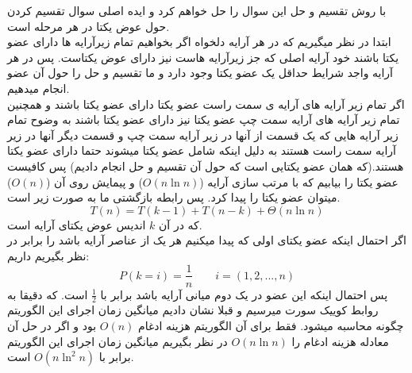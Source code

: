 \problem{}
با روش تقسیم و حل این سوال را حل خواهم کرد و ایده اصلی سوال تقسیم کردن حول
عوض یکتا در هر مرحله است.\\
ابتدا در نظر میگیریم که در هر آرایه دلخواه اگر بخواهیم تمام زیرآرایه ها دارای
عضو یکتا باشند خود آرایه اصلی که جز زیرآرایه هاست نیز دارای عوض یکتاست.
پس در هر آرایه واجد شرایط حداقل یک عضو یکتا وجود دارد و ما تقسیم و حل را
حول آن عضو انجام میدهیم.\\
اگر تمام زیر آرایه های آرایه ی سمت راست عضو یکتا دارای عضو یکتا باشند 
و همچنین تمام زیر آرایه های آرایه سمت چپ عضو یکتا نیز دارای عضو یکتا باشند
به وضوح تمام زیر آرایه هایی که یک قسمت از آنها در زیر آرایه سمت چپ
و قسمت دیگر آنها در زیر آرایه سمت راست هستند به دلیل اینکه شامل عضو یکتا میشوند
حتما دارای عضو یکتا هستند.(که همان عضو یکتایی است که حول آن تقسیم و حل انجام دادیم)
پس کافیست عضو یکتا را بیابیم که با مرتب سازی آرایه ($O(n\ln{n})$)
و پیمایش روی آن ($O(n)$)
میتوان عضو یکتا را پیدا کرد.
پس رابطه بازگشتی ما به صورت زیر است.\\
\[ T(n) = T(k-1) + T(n-k) + \Theta(n\ln{n}) \]
که در آن $k$ اندیس عوض یکتای آرایه است.\\
اگر احتمال اینکه عضو یکتای اولی که پیدا میکنیم هر یک از عناصر آرایه باشد را برابر در نظر بگیریم داریم:\\
\[P(k=i) = \frac{1}{n}  \quad \quad  i = (1,2,...,n)\]
پس احتمال اینکه این عضو در یک دوم میانی آرایه باشد برابر با $\frac{1}{2}$ است.
که دقیقا به روابط کوییک سورت میرسیم و قبلا نشان دادیم میانگین زمان اجرای این الگوریتم چگونه محاسبه میشود.
فقط برای آن الگوریتم هزینه ادغام $O(n)$ بود و اگر در حل آن معادله هزینه ادغام را $O(n\ln{n})$ 
در نظر بگیریم میانگین زمان اجرای این الگوریتم برابر با $O(n\ln^2{n})$ است.